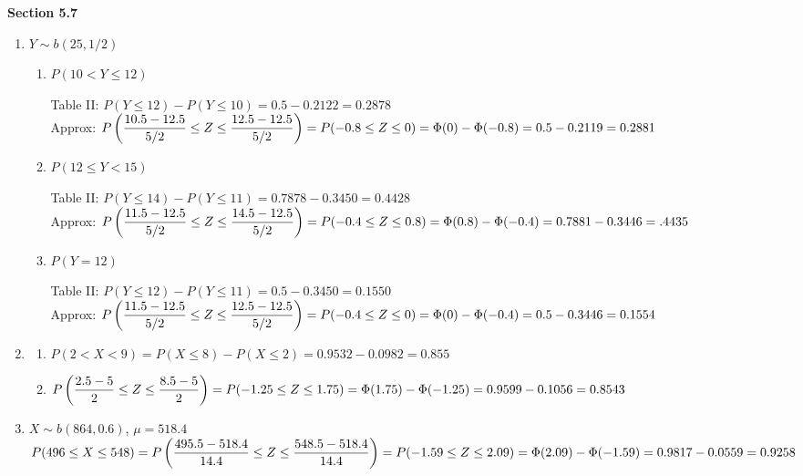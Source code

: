 \documentclass{article}
\newcommand\myskip[1]{\addtocounter{enumi}{#1}}
\begin{document}
    \textbf{Section 5.7}
    \begin{enumerate}
     \item 
      $Y \sim b(25, 1/2)$
      \begin{enumerate}
       \item
	$P(10 < Y \le 12)$
	
	Table II: $P(Y \le 12) - P(Y \le 10) = 0.5 - 0.2122 = 0.2878$ \\
	Approx: $P\left(\dfrac{10.5 - 12.5}{5/2} \le Z \le \dfrac{12.5-12.5}{5/2}\right) 
	  = P(-0.8 \le Z \le 0) \\ = \Phi(0) - \Phi(-0.8) = 0.5 - 0.2119 = 0.2881$
       
       \item
	$P(12 \le Y < 15)$
	
	Table II: $P(Y \le 14) - P(Y \le 11) = 0.7878 - 0.3450 = 0.4428$ \\
	Approx: $P\left(\dfrac{11.5 - 12.5}{5/2} \le Z \le \dfrac{14.5 - 12.5}{5/2}\right)
	  = P(-0.4 \le Z \le 0.8) \\ = \Phi(0.8) - \Phi(-0.4) = 0.7881 - 0.3446 = .4435$
       
       \item
	$P(Y=12)$
	
	Table II: $P(Y \le 12) - P(Y \le 11) = 0.5 - 0.3450 = 0.1550$ \\
	Approx: $P\left(\dfrac{11.5 - 12.5}{5/2} \le Z \le \dfrac{12.5 - 12.5}{5/2}\right)
	  = P(-0.4 \le Z \le 0) \\ = \Phi(0) - \Phi(-0.4) = 0.5 - 0.3446 = 0.1554$
      \end{enumerate}
     
     \item
      \begin{enumerate}
       \item 
	$P(2 < X < 9) = P(X \le 8) - P(X \le 2) = 0.9532 - 0.0982 = 0.855$
       
       \item
	$P\left(\dfrac{2.5 - 5}{2} \le Z \le \dfrac{8.5 - 5}{2}\right) = P(-1.25 \le Z \le 1.75)
	  \\ = \Phi(1.75) - \Phi(-1.25) = 0.9599 - 0.1056 = 0.8543$
      \end{enumerate}
     
     \item
      $X \sim b(864, 0.6)$, $\mu = 518.4$ \\
      $P(496 \le X \le 548) = P\left(\dfrac{495.5-518.4}{14.4} \le Z \le \dfrac{548.5-518.4}{14.4}\right)
	= P(-1.59 \le Z \le 2.09) \\ = \Phi(2.09) - \Phi(-1.59) = 0.9817 - 0.0559 = 0.9258$
     \myskip{3}
     

\end{enumerate}
\end{document}
